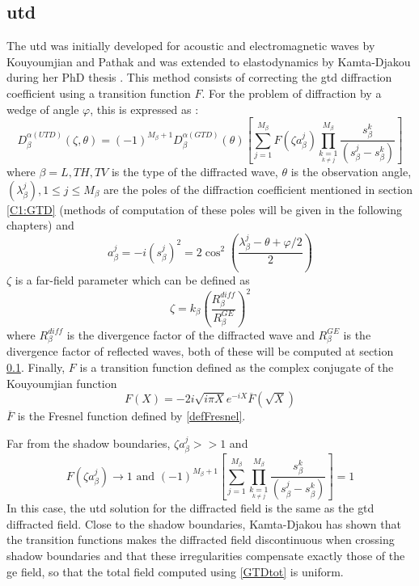 \subsection{\acrfull{utd}}
The \acrfull{utd} was initially developed for acoustic and electromagnetic waves by Kouyoumjian and Pathak \cite{Kouyoumjian,PathakKouyou} and was extended to elastodynamics by Kamta-Djakou during her PhD thesis \cite{Audrey,AKDthese}. This method consists of correcting the \acrshort{gtd} diffraction coefficient using a transition function $F$. For the problem of diffraction by a wedge of angle $\varphi$, this is expressed as :
\begin{equation}
    D_{\beta}^{\alpha(UTD)}(\zeta,\theta)=(-1)^{M_{\beta}+1}D_{\beta}^{\alpha(GTD)}(\theta)\left[ \sum_{j=1}^{M_{\beta}} F(\zeta a^j_{\beta})\prod_{\underset{k\neq j}{k=1}}^{M_{\beta}} \dfrac{s_\beta^{k}}{(s_\beta^{j}-s_\beta^{k})}\right]
    \label{DUTDGTD}
\end{equation}
where $\beta=L,TH,TV$ is the type of the diffracted wave, $\theta$ is the observation angle, $(\lambda^j_{\beta}), 1\leq j\leq M_{\beta}$ are the poles of the diffraction coefficient mentioned in section \ref{C1:GTD} (methods of computation of these poles will be given in the following chapters) and 
\begin{equation}
    a_{\beta}^j=-i(s_{\beta}^j)^2=2\cos^2\left(\frac{\lambda_{\beta}^j-\theta+\varphi/2}{2}\right)
\end{equation}
$\zeta$ is a far-field parameter which can be defined as
\begin{equation}
    \zeta=k_{\beta}\left(\dfrac{R_{\beta}^{diff}}{R_{\beta}^{GE}}\right)^2
\end{equation}
where $R_{\beta}^{diff}$ is the divergence factor of the diffracted wave and $R_{\beta}^{GE}$ is the divergence factor of reflected waves, both of these will be computed at section \ref{}. Finally, $F$ is a transition function defined as the complex conjugate of the Kouyoumjian function \cite{Kouyoumjian}
\begin{equation}
    F(X)=-2i\sqrt{i\pi X}e^{-iX}\overline{F}(\sqrt{X})
\end{equation}
$\overline{F}$ is the Fresnel function defined by \eqref{defFresnel}.

Far from the shadow boundaries, $\zeta a_{\beta}^j >>1$ and
\begin{equation}
F(\zeta a_{\beta}^j) \rightarrow 1 \mbox{ and } (-1)^{M_{\beta}+1}\left[ \sum_{j=1}^{M_{\beta}} \prod_{\underset{k\neq j}{k=1}}^{M_{\beta}} \dfrac{s_\beta^{k}}{(s_\beta^{j}-s_\beta^{k})}\right]=1
\end{equation}
In this case, the \acrshort{utd} solution for the diffracted field is the same as the \acrshort{gtd} diffracted field. Close to the shadow boundaries, Kamta-Djakou \cite{AKDthese} has shown that the transition functions makes the diffracted field discontinuous when crossing shadow boundaries and that these irregularities compensate exactly those of the \acrshort{ge} field, so that the total field computed using \eqref{GTDtot} is uniform.

